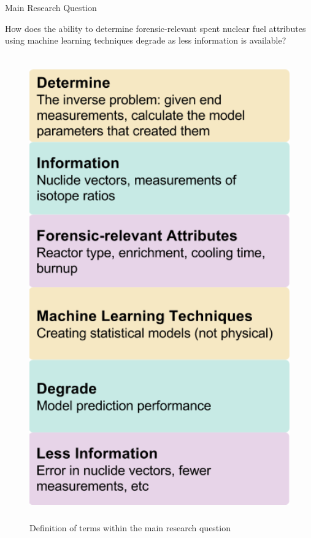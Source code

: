 \documentclass{beamer}
\begin{document}
\begin{frame}[t]{}
\begin{columns}
\begin{column}[T]{0.72\textwidth}
\begin{columns}[t]
\begin{column}{0.32\textwidth}
\begin{block}{Main Research Question}

How does the ability to determine forensic-relevant spent nuclear fuel
attributes using machine learning techniques degrade as less information is
available?

\begin{figure}
  \includegraphics[height=20cm]{figures/overview.png}
  \caption{Definition of terms within the main research question}
  \label{fig:overview}
\end{figure}


\end{block}
\end{column}
\end{columns}
\end{column}
\end{columns}
\end{frame}
\end{document}
